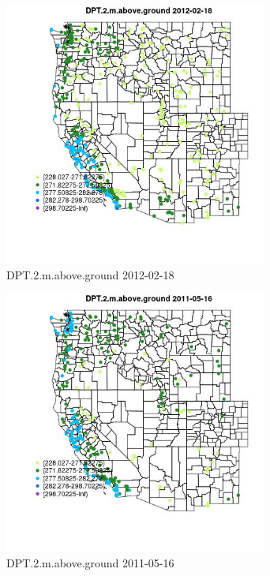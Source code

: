 \begin{figure} 
\centering  
\includegraphics[width=0.77\textwidth]{Code_Outputs/Report_ML_input_PM25_Step4_part_f_de_duplicated_aveswNAs_MapObsDPT2maboveground2012-02-18.jpg} 
\caption{\label{fig:Report_ML_input_PM25_Step4_part_f_de_duplicated_aveswNAsMapObsDPT2maboveground2012-02-18}DPT.2.m.above.ground 2012-02-18} 
\end{figure} 
 

\begin{figure} 
\centering  
\includegraphics[width=0.77\textwidth]{Code_Outputs/Report_ML_input_PM25_Step4_part_f_de_duplicated_aveswNAs_MapObsDPT2maboveground2011-05-16.jpg} 
\caption{\label{fig:Report_ML_input_PM25_Step4_part_f_de_duplicated_aveswNAsMapObsDPT2maboveground2011-05-16}DPT.2.m.above.ground 2011-05-16} 
\end{figure} 
 

